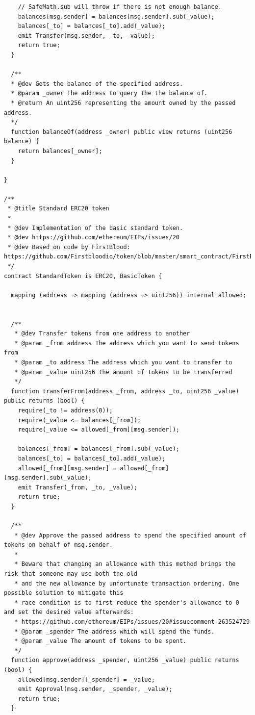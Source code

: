 \documentclass[a4paper,12pt,titlepage]{ctexart}
\begin{document}
\begin{scriptsize}
\begin{verbatim}
    // SafeMath.sub will throw if there is not enough balance.
    balances[msg.sender] = balances[msg.sender].sub(_value);
    balances[_to] = balances[_to].add(_value);
    emit Transfer(msg.sender, _to, _value);
    return true;
  }

  /**
  * @dev Gets the balance of the specified address.
  * @param _owner The address to query the the balance of.
  * @return An uint256 representing the amount owned by the passed address.
  */
  function balanceOf(address _owner) public view returns (uint256 balance) {
    return balances[_owner];
  }

}

/**
 * @title Standard ERC20 token
 *
 * @dev Implementation of the basic standard token.
 * @dev https://github.com/ethereum/EIPs/issues/20
 * @dev Based on code by FirstBlood: https://github.com/Firstbloodio/token/blob/master/smart_contract/FirstBloodToken.sol
 */
contract StandardToken is ERC20, BasicToken {

  mapping (address => mapping (address => uint256)) internal allowed;


  /**
   * @dev Transfer tokens from one address to another
   * @param _from address The address which you want to send tokens from
   * @param _to address The address which you want to transfer to
   * @param _value uint256 the amount of tokens to be transferred
   */
  function transferFrom(address _from, address _to, uint256 _value) public returns (bool) {
    require(_to != address(0));
    require(_value <= balances[_from]);
    require(_value <= allowed[_from][msg.sender]);

    balances[_from] = balances[_from].sub(_value);
    balances[_to] = balances[_to].add(_value);
    allowed[_from][msg.sender] = allowed[_from][msg.sender].sub(_value);
    emit Transfer(_from, _to, _value);
    return true;
  }

  /**
   * @dev Approve the passed address to spend the specified amount of tokens on behalf of msg.sender.
   *
   * Beware that changing an allowance with this method brings the risk that someone may use both the old
   * and the new allowance by unfortunate transaction ordering. One possible solution to mitigate this
   * race condition is to first reduce the spender's allowance to 0 and set the desired value afterwards:
   * https://github.com/ethereum/EIPs/issues/20#issuecomment-263524729
   * @param _spender The address which will spend the funds.
   * @param _value The amount of tokens to be spent.
   */
  function approve(address _spender, uint256 _value) public returns (bool) {
    allowed[msg.sender][_spender] = _value;
    emit Approval(msg.sender, _spender, _value);
    return true;
  }


\end{verbatim}
\end{scriptsize}
\end{document}
